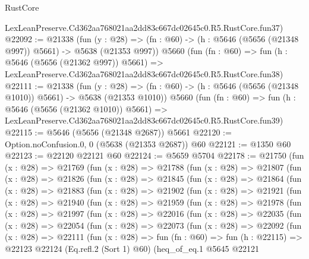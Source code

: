 \begin{lexlean}{RustCore}
\begin{coremodule}
    LexLeanPreserve.Cd362aa768021aa2dd83c667dc02645c0.R5.RustCore.fun37)
@22092 := @21338
    (fun (y : @28) => (fn : @60) -> (h : @5646 (@5656 (@21348 @997)) @5661) -> @5638 (@21353 @997))
    @5660
    (fun (fn : @60) =>
    fun (h : @5646 (@5656 (@21362 @997)) @5661) =>
    LexLeanPreserve.Cd362aa768021aa2dd83c667dc02645c0.R5.RustCore.fun38)
@22111 := @21338
    (fun (y : @28) =>
    (fn : @60) -> (h : @5646 (@5656 (@21348 @1010)) @5661) -> @5638 (@21353 @1010))
    @5660
    (fun (fn : @60) =>
    fun (h : @5646 (@5656 (@21362 @1010)) @5661) =>
    LexLeanPreserve.Cd362aa768021aa2dd83c667dc02645c0.R5.RustCore.fun39)
@22115 := @5646 (@5656 (@21348 @2687)) @5661
@22120 := Option.noConfusion.{0, 0} (@5638 (@21353 @2687)) @60
@22121 := @1350 @60
@22123 := @22120 @22121 @60
@22124 := @5659 @5704
@22178 := @21750
    (fun (x : @28) =>
    @21769
      (fun (x : @28) =>
      @21788
        (fun (x : @28) =>
        @21807
          (fun (x : @28) =>
          @21826
            (fun (x : @28) =>
            @21845
              (fun (x : @28) =>
              @21864
                (fun (x : @28) =>
                @21883
                  (fun (x : @28) =>
                  @21902
                    (fun (x : @28) =>
                    @21921
                      (fun (x : @28) =>
                      @21940
                        (fun (x : @28) =>
                        @21959
                          (fun (x : @28) =>
                          @21978
                            (fun (x : @28) =>
                            @21997
                              (fun (x : @28) =>
                              @22016
                                (fun (x : @28) =>
                                @22035
                                  (fun (x : @28) =>
                                  @22054
                                    (fun (x : @28) =>
                                    @22073
                                      (fun (x : @28) =>
                                      @22092
                                        (fun (x : @28) =>
                                        @22111
                                          (fun (x : @28) =>
                                          fun (fn : @60) =>
                                          fun (h : @22115) =>
                                          @22123
                                            @22124
                                            (Eq.refl.{2} (Sort 1) @60)
                                            (heq_of_eq.{1}
                                              @5645
                                              @22121

\end{coremodule}
\end{lexlean}
